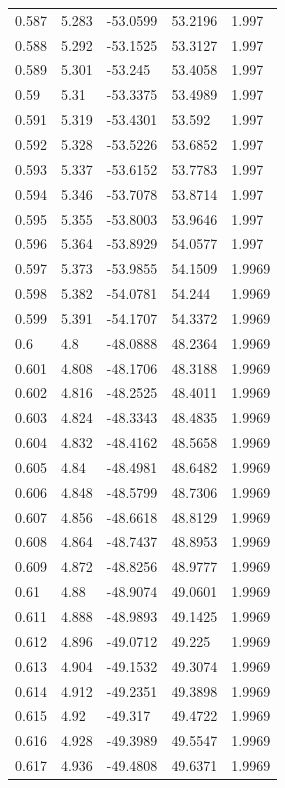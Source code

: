 \begin{tabular}{lllll}
0.587 & 5.283 & -53.0599 & 53.2196 & 1.997 \\
0.588 & 5.292 & -53.1525 & 53.3127 & 1.997 \\
0.589 & 5.301 & -53.245 & 53.4058 & 1.997 \\
0.59 & 5.31 & -53.3375 & 53.4989 & 1.997 \\
0.591 & 5.319 & -53.4301 & 53.592 & 1.997 \\
0.592 & 5.328 & -53.5226 & 53.6852 & 1.997 \\
0.593 & 5.337 & -53.6152 & 53.7783 & 1.997 \\
0.594 & 5.346 & -53.7078 & 53.8714 & 1.997 \\
0.595 & 5.355 & -53.8003 & 53.9646 & 1.997 \\
0.596 & 5.364 & -53.8929 & 54.0577 & 1.997 \\
0.597 & 5.373 & -53.9855 & 54.1509 & 1.9969 \\
0.598 & 5.382 & -54.0781 & 54.244 & 1.9969 \\
0.599 & 5.391 & -54.1707 & 54.3372 & 1.9969 \\
0.6 & 4.8 & -48.0888 & 48.2364 & 1.9969 \\
0.601 & 4.808 & -48.1706 & 48.3188 & 1.9969 \\
0.602 & 4.816 & -48.2525 & 48.4011 & 1.9969 \\
0.603 & 4.824 & -48.3343 & 48.4835 & 1.9969 \\
0.604 & 4.832 & -48.4162 & 48.5658 & 1.9969 \\
0.605 & 4.84 & -48.4981 & 48.6482 & 1.9969 \\
0.606 & 4.848 & -48.5799 & 48.7306 & 1.9969 \\
0.607 & 4.856 & -48.6618 & 48.8129 & 1.9969 \\
0.608 & 4.864 & -48.7437 & 48.8953 & 1.9969 \\
0.609 & 4.872 & -48.8256 & 48.9777 & 1.9969 \\
0.61 & 4.88 & -48.9074 & 49.0601 & 1.9969 \\
0.611 & 4.888 & -48.9893 & 49.1425 & 1.9969 \\
0.612 & 4.896 & -49.0712 & 49.225 & 1.9969 \\
0.613 & 4.904 & -49.1532 & 49.3074 & 1.9969 \\
0.614 & 4.912 & -49.2351 & 49.3898 & 1.9969 \\
0.615 & 4.92 & -49.317 & 49.4722 & 1.9969 \\
0.616 & 4.928 & -49.3989 & 49.5547 & 1.9969 \\
0.617 & 4.936 & -49.4808 & 49.6371 & 1.9969 \\

\end{tabular}
